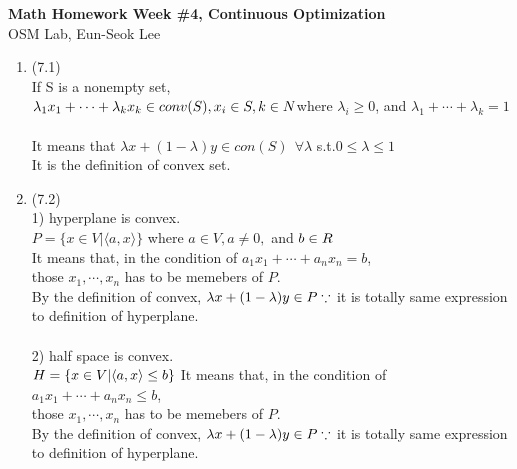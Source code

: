 \documentclass[letterpaper,12pt]{article}
\theoremstyle{definition}
\begin{document}
\begin{flushleft}
   \textbf{\large{Math Homework Week \#4, Continuous Optimization}} \\[5pt]
   OSM Lab, Eun-Seok Lee \\[5pt]

\end{flushleft}

\vspace{5mm}

\begin{enumerate}



	\item (7.1) \\
If S is a nonempty set, \\$\lambda_1x_1 + \cdots + \lambda_kx_k \in conv(S), x_i\in S, k\in N\\
 $where $ \lambda_i \geq 0$, and $\lambda_1 + \cdots + \lambda_k =1 $ \\ \\
It means that $\lambda x+(1-\lambda)y \in con(S) \ \ \forall \lambda $ s.t.$ 0 \leq \lambda \leq 1 $ \\
It is the definition of convex set.


	\item (7.2) \\
1) hyperplane is convex. \\
$P = \{ x\in V | \langle a,x\rangle \}$ where $ a \in V, a \neq 0, $ and $ b \in R \\ $\\
It means that, in the condition of $a_1x_1 + \cdots + a_nx_n = b $, \\
those $x_1, \cdots,  x_n$ has to be memebers of $P$.
\\
By the definition of convex, $\lambda x + (1-\lambda)y \in P \\
\because$ it is totally same expression to definition of hyperplane. \\ \\

2) half space is convex. \\
$H = \{ x \in V | \langle a,x\rangle \leq b \} \\$
It means that, in the condition of $a_1x_1 + \cdots + a_nx_n \leq b $, \\
those $x_1, \cdots,  x_n$ has to be memebers of $P$.
\\
By the definition of convex, $\lambda x + (1-\lambda)y \in P \\
\because$ it is totally same expression to definition of hyperplane. \\ \\


\end{enumerate}
\end{document}
